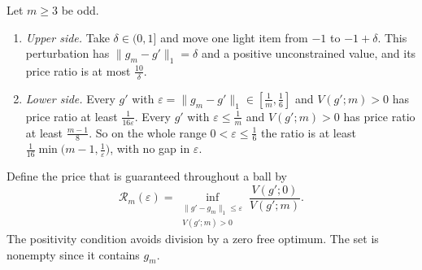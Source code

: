\begin{theorem}
\label{thm:collapse}
Let $m\ge3$ be odd.
\begin{enumerate}
\item[(a)] \emph{Upper side.} Take $\delta\in(0,1]$ and move one light item from $-1$ to
$-1+\delta$. This perturbation has $\|g_{m}-g'\|_{1}=\delta$ and a positive unconstrained
value, and its price ratio is at most $\frac{10}{\delta}$.
\item[(b)] \emph{Lower side.} Every $g'$ with $\varepsilon=\|g_{m}-g'\|_{1}\in[\frac1m,\frac16]$
and $V(g';m)>0$ has price ratio at least $\frac{1}{16\varepsilon}$. Every $g'$ with
$\varepsilon\le\frac1m$ and $V(g';m)>0$ has price ratio at least $\frac{m-1}{8}$. So on the
whole range $0<\varepsilon\le\frac16$ the ratio is at least
$\frac1{16}\min\bigl(m-1,\frac1\varepsilon\bigr)$, with no gap in $\varepsilon$.
\end{enumerate}
\end{theorem}


Define the price that is guaranteed throughout a ball by
\begin{equation}
\mathcal R_m(\varepsilon)=
\inf_{\substack{\|g'-g_m\|_1\le\varepsilon\\V(g';m)>0}}
\frac{V(g';0)}{V(g';m)}.
\label{eq:robustball}
\end{equation}
The positivity condition avoids division by a zero free optimum. The set is nonempty since
it contains $g_m$.

